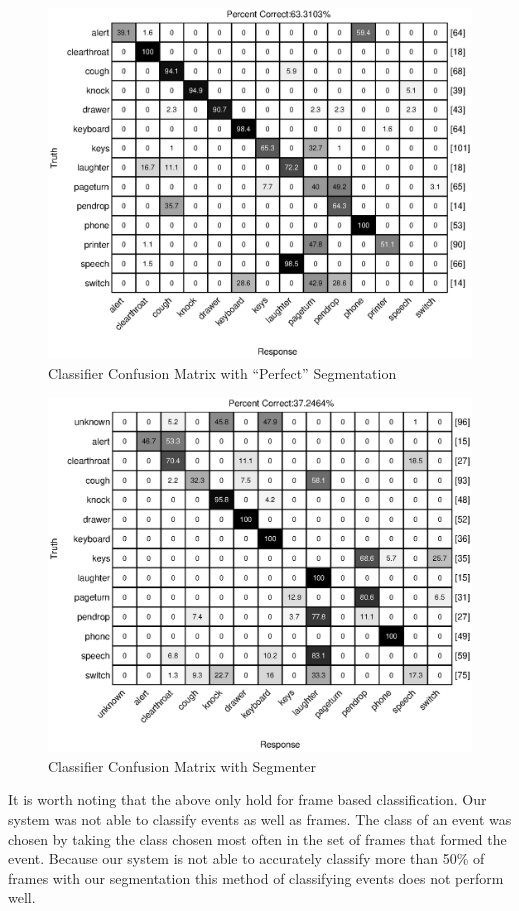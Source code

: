 \begin{figure}[h]
  \centering           \centerline{\includegraphics[width=\columnwidth]{confmatrix1}}
  \caption{Classifier Confusion Matrix with ``Perfect'' Segmentation}
  \label{fig:confmat_perfect}
\end{figure}

\begin{figure}[h]
  \centering  \centerline{\includegraphics[width=\columnwidth]{confmatrix2}}
  \caption{Classifier Confusion Matrix with Segmenter}
  \label{fig:confmat_seg}
\end{figure}

It is worth noting that the above only hold for frame based classification. Our system was
not able to classify events as well as frames. The class of an event was chosen by taking 
the class chosen most often in the set of frames that formed the event. Because our system
is not able to accurately classify more than 50\% of frames with our segmentation this method
of classifying events does not perform well.  
